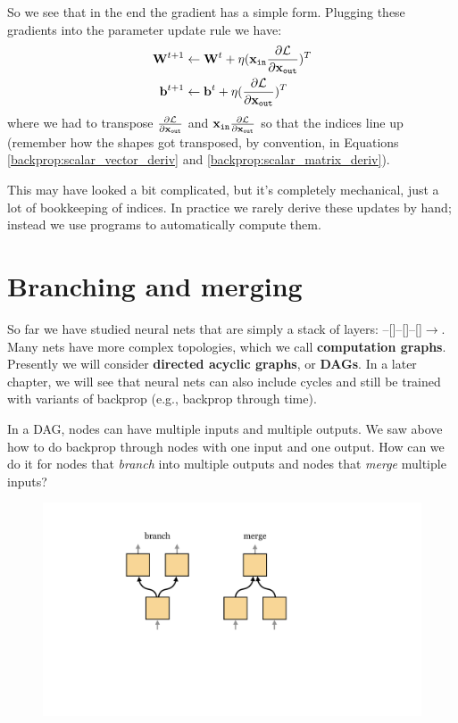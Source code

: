 So we see that in the end the gradient has a simple form. Plugging these gradients into the parameter update rule we have:
\begin{align}
    \mathbf{W}^{t+1} &\leftarrow \mathbf{W}^t + \eta (\mathbf{x}_{\texttt{in}} \frac{\partial \mathcal{L}}{\partial \mathbf{x}_{\texttt{out}}})^T\\
    \mathbf{b}^{t+1} &\leftarrow \mathbf{b}^t + \eta (\frac{\partial \mathcal{L}}{\partial \mathbf{x}_{\texttt{out}}})^T
\end{align}
where we had to transpose $\frac{\partial \mathcal{L}}{\partial \mathbf{x}_{\texttt{out}}}$ and $\mathbf{x}_{\texttt{in}} \frac{\partial \mathcal{L}}{\partial \mathbf{x}_{\texttt{out}}}$ so that the indices line up (remember how the shapes got transposed, by convention, in Equations \ref{backprop:scalar_vector_deriv} and  \ref{backprop:scalar_matrix_deriv}).

This may have looked a bit complicated, but it's completely mechanical, just a lot of bookkeeping of indices. In practice we rarely derive these updates by hand; instead we use programs to automatically compute them.

\section{Branching and merging}
So far we have studied neural nets that are simply a stack of layers: --[]--[]--[]$\rightarrow$. Many nets have more complex topologies, which we call {\bf computation graphs}. Presently we will consider {\bf directed acyclic graphs}, or {\bf DAGs}. In a later chapter, we will see that neural nets can also include cycles and still be trained with variants of backprop (e.g., backprop through time).

In a DAG, nodes can have multiple inputs and multiple outputs. We saw above how to do backprop through nodes with one input and one output. How can we do it for nodes that \emph{branch} into multiple outputs and nodes that \emph{merge} multiple inputs?

\begin{figure}[h]
    \centering
    \includegraphics[width=0.42\linewidth]{./figures/backpropagation/branch_merge.pdf}
    \label{fig:backprop_branch_merge}
\end{figure}

